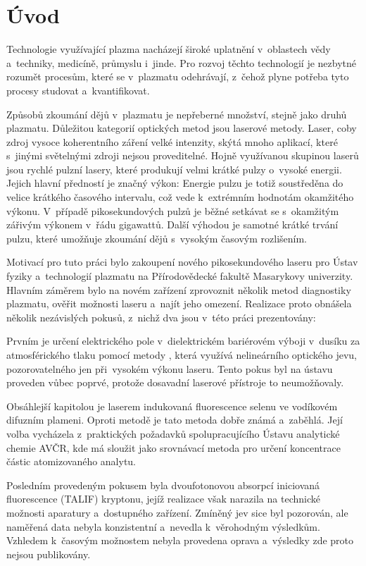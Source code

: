 \chapter*{Úvod}
Technologie využívající plazma nacházejí široké uplatnění v~oblastech
vědy a~techniky, medicíně, průmyslu i~jinde.
Pro rozvoj těchto technologií je nezbytné rozumět procesům,
které se v~plazmatu odehrávají, z~čehož plyne potřeba tyto procesy
studovat a~kvantifikovat.

Způsobů zkoumání dějů v~plazmatu je nepřeberné množství,
stejně jako druhů plazmatu.
Důležitou kategorií optických metod jsou laserové metody.
Laser, coby zdroj vysoce koherentního záření velké intenzity,
skýtá mnoho aplikací, které s~jinými světelnými zdroji nejsou proveditelné.
Hojně využívanou skupinou laserů jsou rychlé pulzní lasery,
které produkují velmi krátké pulzy o~vysoké energii.
Jejich hlavní předností je značný výkon:
Energie pulzu je totiž soustředěna do velice krátkého časového intervalu,
což vede k~extrémním hodnotám okamžitého výkonu.
V~případě pikosekundových pulzů je běžné setkávat se s~okamžitým zářivým
výkonem v~řádu gigawattů.
Další výhodou je samotné krátké trvání pulzu, které umožňuje zkoumání
dějů s~vysokým časovým rozlišením.

Motivací pro tuto práci bylo zakoupení nového pikosekundového laseru
pro Ústav fyziky a~technologií plazmatu na Přírodovědecké fakultě
Masarykovy univerzity.
Hlavním záměrem bylo na novém zařízení zprovoznit několik metod
diagnostiky plazmatu, ověřit možnosti laseru a~najít jeho omezení.
Realizace proto obnášela několik nezávislých pokusů,
z~nichž dva jsou v~této práci prezentovány:

Prvním je určení elektrického pole v~dielektrickém bariérovém výboji
v~dusíku za atmosférického tlaku pomocí metody \EFISH{},
která využívá nelineárního optického jevu,
pozorovatelného jen při~vysokém výkonu laseru.
Tento pokus byl na ústavu proveden vůbec poprvé, protože dosavadní
laserové přístroje to neumožňovaly.

Obsáhlejší kapitolou je laserem indukovaná fluorescence selenu
ve vodíkovém difuzním plameni.
Oproti metodě \EFISH{} je tato metoda dobře známá a~zaběhlá.
Její volba vycházela z~praktických požadavků spolupracujícího
Ústavu analytické chemie AVČR, kde má sloužit jako srovnávací
metoda pro určení koncentrace částic atomizovaného analytu.

Posledním provedeným pokusem byla dvoufotonovou absorpcí iniciovaná
fluorescence (TALIF) kryptonu, jejíž realizace však narazila na technické
možnosti aparatury a~dostupného zařízení.
Zmíněný jev sice byl pozorován, ale naměřená data nebyla konzistentní
a~nevedla k~věrohodným výsledkům.
Vzhledem k~časovým možnostem nebyla provedena oprava
a~výsledky zde proto nejsou publikovány.

